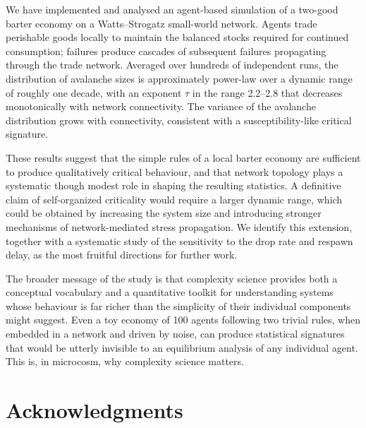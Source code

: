 \documentclass[11pt,a4paper]{article}
\begin{document}
We have implemented and analysed an agent-based simulation of a two-good
barter economy on a Watts--Strogatz small-world network. Agents trade
perishable goods locally to maintain the balanced stocks required for
continued consumption; failures produce cascades of subsequent failures
propagating through the trade network. Averaged over hundreds of
independent runs, the distribution of avalanche sizes is approximately
power-law over a dynamic range of roughly one decade, with an exponent
$\tau$ in the range 2.2--2.8 that decreases monotonically with network
connectivity. The variance of the avalanche distribution grows with
connectivity, consistent with a susceptibility-like critical signature.

These results suggest that the simple rules of a local barter economy are
sufficient to produce qualitatively critical behaviour, and that network
topology plays a systematic though modest role in shaping the resulting
statistics. A definitive claim of self-organized criticality would require
a larger dynamic range, which could be obtained by increasing the system
size and introducing stronger mechanisms of network-mediated stress
propagation. We identify this extension, together with a systematic
study of the sensitivity to the drop rate and respawn delay, as the most
fruitful directions for further work.

The broader message of the study is that complexity science provides
both a conceptual vocabulary and a quantitative toolkit for understanding
systems whose behaviour is far richer than the simplicity of their
individual components might suggest. Even a toy economy of 100 agents
following two trivial rules, when embedded in a network and driven by
noise, can produce statistical signatures that would be utterly invisible
to an equilibrium analysis of any individual agent. This is, in
microcosm, why complexity science matters.

\section*{Acknowledgments}
\end{document}
